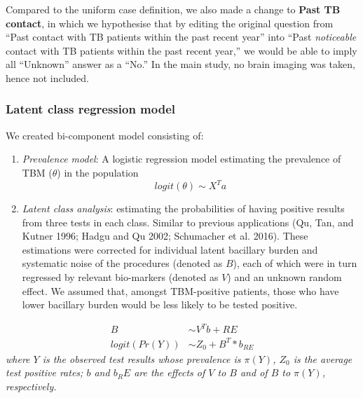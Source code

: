 \documentclass[
]{article}
\providecommand{\tightlist}{%
  \setlength{\itemsep}{0pt}\setlength{\parskip}{0pt}}
\begin{document}
Compared to the uniform case definition, we also made a change to \textbf{Past TB contact}, in which we hypothesise that by editing the original question from ``Past contact with TB patients within the past recent year'' into ``Past \emph{noticeable} contact with TB patients within the past recent year,'' we would be able to imply all ``Unknown'' answer as a ``No.'' In the main study, no brain imaging was taken, hence not included.

\hypertarget{latent-class-regression-model}{%
\subsubsection{Latent class regression model}\label{latent-class-regression-model}}

We created bi-component model consisting of:

\begin{enumerate}
\def\labelenumi{\arabic{enumi}.}
\tightlist
\item
  \emph{Prevalence model}: A logistic regression model estimating the prevalence of TBM (\(\theta\)) in the population
  \[
  logit(\theta) \sim X^Ta
    \]
\item
  \emph{Latent class analysis}: estimating the probabilities of having positive results from three tests in each class. Similar to previous applications (Qu, Tan, and Kutner 1996; Hadgu and Qu 2002; Schumacher et al. 2016). These estimations were corrected for individual latent bacillary burden and systematic noise of the procedures (denoted as \(B\)), each of which were in turn regressed by relevant bio-markers (denoted as \(V\)) and an unknown random effect. We assumed that, amongst TBM-positive patients, those who have lower bacillary burden would be less likely to be tested positive.
\end{enumerate}

\[
\begin{aligned}
  B &\sim V^Tb + RE\\
  logit(Pr(Y)) &\sim Z_0 + B^T * b_{RE}
\end{aligned}
\]
\emph{where \(Y\) is the observed test results whose prevalence is \(\pi(Y)\), \(Z_0\) is the average test positive rates; \(b\) and \(b_RE\) are the effects of \(V\) to \(B\) and of \(B\) to \(\pi(Y)\), respectively.}

\providecommand{\docline}[3]{\noalign{\global\setlength{\arrayrulewidth}{#1}}\arrayrulecolor[HTML]{#2}\cline{#3}}

\setlength{\tabcolsep}{2pt}
\end{document}
